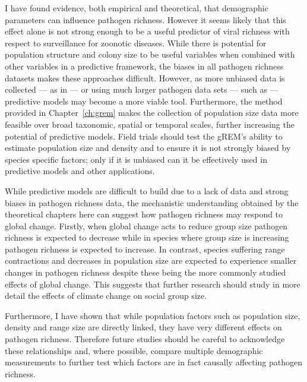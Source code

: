 I have found evidence, both empirical and theoretical, that demographic parameters can influence pathogen richness.
However it seems likely that this effect alone is not strong enough to be a useful predictor of viral richness with respect to surveillance for zoonotic diseases.
While there is potential for population structure and colony size to be useful variables when combined with other variables in a predictive framework, the biases in all pathogen richness datasets makes these approaches difficult.
However, as more unbiased data is collected --- as in \textcite{anthony2013strategy, anthony2015non} --- or using much larger pathogen data sets --- such as \textcite{wardeh2015database} --- predictive models may become a more viable tool.
Furthermore, the method provided in Chapter~\ref{ch:grem} makes the collection of population size data more feasible over broad taxonomic, spatial or temporal scales, further increasing the potential of predictive models.
Field trials should test the gREM's ability to estimate population size and density and to ensure it is not strongly biased by species specific factors; only if it is unbiased can it be effectively used in predictive models and other applications.

While predictive models are difficult to build due to a lack of data and strong biases in pathogen richness data, the mechanistic understanding obtained by the theoretical chapters here can suggest how pathogen richness may respond to global change.
Firstly, when global change acts to reduce group size \cite{lehmann2010apes, zunino2007habitat, manor2003impact, atwood2006influence} pathogen richness is expected to decrease while in species where group size is increasing \cite{lehmann2010apes} pathogen richness is expected to increase.
In contrast, species suffering range contractions \cite{thomas2004extinction} and decreases in population size \cite{craigie2010large} are expected to experience smaller changes in pathogen richness despite these being the more commonly studied effects of global change.
This suggests that further research should study in more detail the effects of climate change on social group size.

Furthermore, I have shown that while population factors such as population size, density and range size are directly linked, they have very different effects on pathogen richness.
Therefore future studies should be careful to acknowledge these relationships and, where possible, compare multiple demographic measurements to further test which factors are in fact causally affecting pathogen richness.




